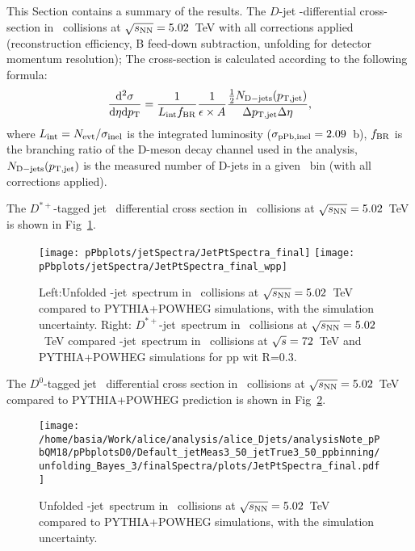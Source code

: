 This Section contains a summary of the results.
The  $D$-jet \pt-differential cross-section in \pPb\ collisions at $\sqrt{s_{\rm NN}}=5.02$~TeV  with all corrections applied (reconstruction efficiency, B feed-down subtraction, unfolding for detector momentum resolution);
The cross-section is calculated according to the following formula:
\begin{equation}
\frac{{\rm d}^2\sigma}{{\rm d}\eta {\rm d}p_{\rm T}}=\frac{1}{L_{\rm int}f_{\rm BR}} \frac{1}{\epsilon \times A}  \frac{ \frac{1}{2} N_{\rm D-jets}(p_{\mathrm{T,jet}})}{ \Delta p_{\mathrm{T,jet}}\Delta\eta},
\end{equation}
where $L_{\rm int}=N_{\rm evt}/\sigma_{\rm inel}$ is the integrated luminosity ($\sigma_{\rm pPb, inel} = 2.09$~b), $f_{\rm BR}$ is the branching
ratio of the D-meson decay channel used in the analysis, $N_{\rm D-jets}(p_{\mathrm{T,jet}})$ is the measured number of D-jets in a given \ptjet\ bin (with all corrections applied).

The $D^{*+}$-tagged jet \pt\ differential cross section in \pPb\ collisions at $\sqrt{s_{\rm NN}}=5.02$~TeV is shown in Fig~\ref{fig:pPbJetPt_final}.
\begin{figure}[bth]
\centering
\texttt{[image: pPbplots/jetSpectra/JetPtSpectra\_final]}
\texttt{[image: pPbplots/jetSpectra/JetPtSpectra\_final\_wpp]}
\caption{Left:Unfolded \Dstar-jet\ spectrum in \pPb\ collisions at $\sqrt{s_{\rm NN}}=5.02$~TeV compared to PYTHIA+POWHEG simulations, with the simulation uncertainty. Right: $D^{*+}$-jet\ spectrum in \pPb\ collisions at $\sqrt{s_{\rm NN}}=5.02$~TeV compared \Dzero-jet\ spectrum in \pp\ collisions at $\sqrt{s}=72$~TeV and PYTHIA+POWHEG simulations for pp wit R=0.3.}
\label{fig:pPbJetPt_final}
\end{figure}

The $D^{0}$-tagged jet \pt\ differential cross section in \pPb\ collisions at $\sqrt{s_{\rm NN}}=5.02$~TeV compared to PYTHIA+POWHEG prediction is shown in Fig~\ref{fig:pPbJetPt_final_D0}.
\begin{figure}[bth]
\centering
\texttt{[image: /home/basia/Work/alice/analysis/alice\_Djets/analysisNote\_pPbQM18/pPbplotsD0/Default\_jetMeas3\_50\_jetTrue3\_50\_ppbinning/unfolding\_Bayes\_3/finalSpectra/plots/JetPtSpectra\_final.pdf]}
\caption{Unfolded \Dzero-jet\ spectrum in \pPb\ collisions at $\sqrt{s_{\rm NN}}=5.02$~TeV compared to PYTHIA+POWHEG simulations, with the simulation uncertainty.}
\label{fig:pPbJetPt_final_D0}
\end{figure}



